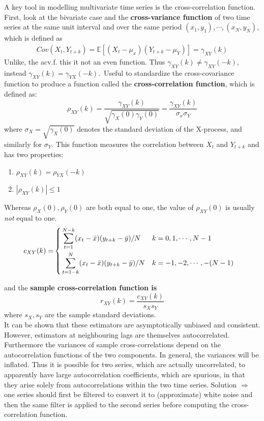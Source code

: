 A key tool in modelling multivariate time series is the cross-correlation function. First, look at the bivariate case and the \textbf{cross-variance function} of two time series at the same unit interval and over the same period $(x_1,y_1), \cdots, (x_N, y_N)$, which is defined as \begin{align}
Cov(X_t,Y_{t+k})=\mathbb{E}[(X_t-\mu_x)(Y_{t+k}-\mu_Y)] = \gamma_{XY}(k) \label{cross-cov}
\end{align}
Unlike, the acv.f. this it not an even function. Thus $\gamma_{XY}(k)\neq \gamma_{XY}(-k)$, instead $\gamma_{XY}(k)=\gamma_{YX}(-k)$.\
Useful to standardize the cross-covariance function to produce a function called the \textbf{cross-correlation function}, which is defined as: \[
\rho_{XY}(k)=\frac{\gamma_{XY}(k)}{\sqrt{\gamma_X(0) \gamma_Y(0)}} = \frac{\gamma_{XY}(k)}{\sigma_x \sigma_Y} \label{cross-corr}
\]
\quad where $\sigma_X = \sqrt{\gamma_X(0)}$ denotes the standard deviation of the X-process, and similarly for $\sigma_Y$. This function measures the correlation between $X_t$ and $Y_{t+k}$ and has two properties: 
\begin{enumerate}
    \item $\rho_{XY}(k)= \rho_{YX}(-k)$
    \item $|\rho_{XY}(k)| \leq 1$
\end{enumerate}
Whereas $\rho_X(0), \rho_Y(0)$ are both equal to one, the value of $\rho_{XY}(0)$ is usually \textit{not} equal to one. \\

\begin{equation}
\begin{split}
c_{XY}(k) = & \left\{
\begin{aligned}
    &\sum_{t=1}^{N-k}(x_t-\Bar{x})(y_{t+k}-\Bar{y})/N  &&k=0,1,\cdots, N-1 \\
    & \sum_{t=1-k}^N (x_t-\Bar{x})(y_{t+k}-\Bar{y})/N && k=-1,-2,\cdots,-(N-1)
\end{aligned}
\right.
\end{split}
\end{equation}

and the \textbf{sample cross-correlation function is} \[
r_{XY}(k)= \frac{c_{XY}(k)}{s_X s_Y}
\] \quad where $s_X,s_Y$ are the sample standard deviations.\\
It can be shown that these estimators are asymptotically unbiased and consistent. However, estimators at neighbouring lags are themselves autocorrelated. Furthermore the variances of sample cross-correlations depend on the autocorrelation functions of the two components. In general, the variances will be inflated. Thus it is possible for two series, which are actually uncorrelated, to apparently have large autocorrelation coefficients, which are spurious, in that they arise solely from autocorrelations within the two time series. Solution $\Rightarrow$ one series should first be filtered to convert it to (approximate) white noise and then the same filter is applied to the second series before computing the cross-correlation function.\\

